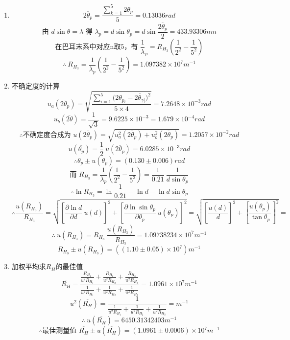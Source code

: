\documentclass[11pt,a4paper,oneside]{article}
\begin{document}
\begin{enumerate}
  \item { }
      $$\overline{2{\theta}_p} = \displaystyle\frac{\sum_{k=1}^5 2{\theta}_p}{5} = 0.13036rad$$
      $$\displaystyle\text{由\ }d\sin{\theta} = {\lambda}\text{\ 得\ }{\lambda}_p = d\sin{\theta}_p = d\sin{\frac{\overline{2{\theta}_p}}{2}} = 433.93306nm$$
      $$\displaystyle\text{在巴耳末系中对应n取5，有\ }\frac{1}{\lambda}_p = R_{H_3}\left(\frac{1}{2^2}-\frac{1}{5^2}\right)$$
      $$\therefore\ \displaystyle R_{H_3} = \frac{1}{ {\lambda}_p}\left(\frac{1}{2^2}-\frac{1}{5^2}\right) = 1.097382{\times}10^{7}m^{-1}$$
  \item {不确定度的计算}
      $$u_a(\overline{2{\theta}_p}) = \displaystyle\sqrt{\frac{\sum_{i=1}^5{(2{\theta}_{p_{i}}-\overline{2{\theta}_{\gamma]}}})^2}{5\times4}}=7.2648{\times}10^{-3} rad$$
      $$u_b(\overline{2\theta}) = \displaystyle\frac{1}{\sqrt3} = 9.6225\times10^{-3} = 1.679 \times 10^{-4} rad$$
      $$\therefore\text{不确定度合成为\ }u(\overline{2{\theta}_p}) = \sqrt{u_a^2(\overline{2{\theta}_p})+u_b^2(\overline{2{\theta}_p})} = 1.2057{\times}10^{-2}rad$$
      $$u(\overline{ {\theta}_p})= \displaystyle\frac12\ u(\overline{2{\theta}_p}) = 6.0285{\times}10^{-3}rad$$
      $$\therefore{\theta}_p \pm u({\theta}_p) = (0.130\pm0.006)rad$$
      $$\text{而\ }\displaystyle R_{H_3} = \frac{1}{ {\lambda}_p}\left(\frac{1}{2^2}-\frac{1}{5^2}\right) = \frac{1}{0.21}\ \frac{1}{d\sin{\theta}_p}$$
      $$\therefore\ln{R_{H_3}} = \ln{\frac{1}{0.21}} -\ln{d} - \ln{d\sin{\theta}_p}$$
      $$\therefore\displaystyle \frac{u(R_{H_3})}{R_{H_3}} = \sqrt{ {\left[\frac{\partial{\ln{d}}}{\partial{d}}\ u(d)\right]}^2 + {\left[\frac{\partial{\ln{\sin{ {\theta}_p}}}}{\partial{ {\theta}_p}}\ u({\theta}_p)\right]}^2} = \sqrt{ {\left[\frac{u(d)}{d}\right]}^2 + {\left[\frac{u({\theta}_p)}{\tan{ {\theta}_p}}\right]}^2} = $$
      $$\therefore \ u(R_{H_3}) = \displaystyle R_{H_3}\ \frac{u(R_{H_3})}{R_{H_3}} = 1.09738234{\times}10^{7}m^{-1}$$ 
      $$R_{H_3} \pm u(R_{H_3}) = ((1.10\pm0.05){\times}10^{7})m^{-1}$$
  \item{加权平均求$R_H$的最佳值}
      $$\overline{R_H} = \displaystyle\frac{\frac{R_{H_1}}{u^2{R_{H_1}}}+\frac{R_{H_2}}{u^2{R_{H_2}}}+\frac{R_{H_3}}{u^2{R_{H_3}}}}{\frac{1}{u^2{R_{H_1}}}+\frac{1}{u^2{R_{H_2}}}+\frac{1}{u^2{R_{H_3}}}} = 1.0961{\times}10^{7}m^{-1}$$
      $$u^2(\overline{R_H}) = \displaystyle\frac{1}{\frac{1}{u^2{R_{H_1}}}+\frac{1}{u^2{R_{H_2}}}+\frac{1}{u^2{R_{H_3}}}} = m^{-1}$$
      $$\therefore \ u(\overline{R_H}) = 6450.31342403m^{-1} $$
      $$\therefore\text{最佳测量值 \ } \overline{R_H} \pm u(\overline{R_H}) = (1.0961\pm0.0006){\times}10^{7} m^{-1}$$   
\end{enumerate}
\end{document}
